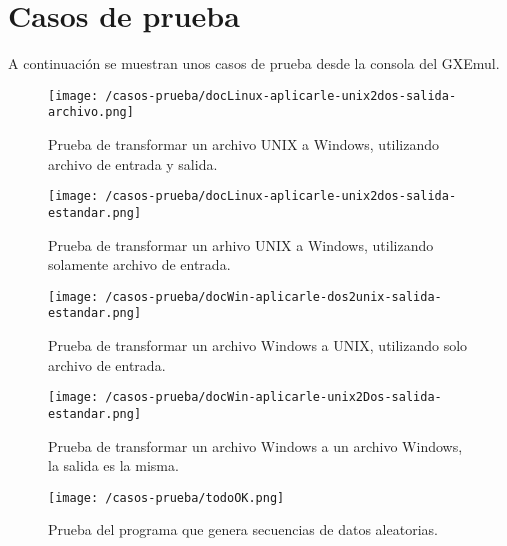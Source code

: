 \documentclass[a4paper]{article}
\begin{document}
\section{Casos de prueba}

A continuación se muestran unos casos de prueba desde la consola del GXEmul.


\begin{figure}[!htp]
\begin{center}
\texttt{[image: /casos-prueba/docLinux-aplicarle-unix2dos-salida-archivo.png]}
\caption{Prueba de transformar un archivo UNIX a Windows, utilizando archivo de entrada y salida.} \label{fig001}
\end{center}
\end{figure}

\begin{figure}[!htp]
\begin{center}
\texttt{[image: /casos-prueba/docLinux-aplicarle-unix2dos-salida-estandar.png]}
\caption{Prueba de transformar un arhivo UNIX a Windows, utilizando solamente archivo de entrada.} \label{fig001}
\end{center}
\end{figure}

\begin{figure}[!htp]
\begin{center}
\texttt{[image: /casos-prueba/docWin-aplicarle-dos2unix-salida-estandar.png]}
\caption{Prueba de transformar un archivo Windows a UNIX, utilizando solo archivo de entrada.} \label{fig001}
\end{center}
\end{figure}

\begin{figure}[!htp]
\begin{center}
\texttt{[image: /casos-prueba/docWin-aplicarle-unix2Dos-salida-estandar.png]}
\caption{Prueba de transformar un archivo Windows a un archivo Windows, la salida es la misma.} \label{fig001}
\end{center}
\end{figure}

\begin{figure}[!htp]
\begin{center}
\texttt{[image: /casos-prueba/todoOK.png]}
\caption{Prueba del programa que genera secuencias de datos aleatorias.} \label{fig001}
\end{center}
\end{figure}
\end{document}

